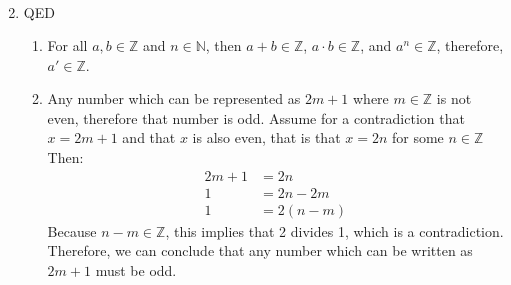 \documentclass[letterpaper,twoside,10pt]{article}
\newcommand{\Z}{\mathbb{Z}}
\begin{document}
\begin{enumerate}
\begin{enumerate}
\begin{align*}
				\end{align*}
		\end{enumerate}
	\item QED
		\begin{enumerate}
			\item For all $a, b \in\mathbb{Z}$ and $n \in \mathbb{N}$, then $a+b \in \mathbb{Z}$, $a\cdot b \in \mathbb{Z}$, and $a^n \in \mathbb{Z}$, therefore, $a' \in \mathbb{Z}$. 
			\item Any number which can be represented as $2m+1$ where $m\in\Z$ is not even, therefore that number is odd. Assume for a contradiction that $x=2m+1$ and that $x$ is also even, that is that $x=2n$ for some $n\in\Z$ Then:
			\begin{align*}
			2m+1 &=2n\\
			1 &= 2n-2m\\
			1 &= 2(n-m)
			\end{align*}
			Because $n-m \in\Z$, this implies that 2 divides 1, which is a contradiction. Therefore, we can conclude that any number which can be written as $2m+1$ must be odd. 
		\end{enumerate}
\end{enumerate}
\end{document}
